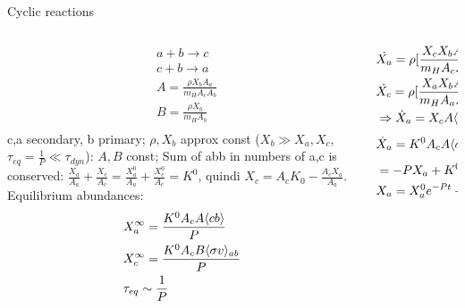 \begin{frame}{Cyclic reactions}
    \begin{columns}[T]
        \begin{column}{0.3\textwidth}
            \begin{align*}
                &a+b\to c\\
                &c+b\to a\\
                &A=\frac{\rho X_bA_a}{m_HA_cA_b}\\
                &B=\frac{\rho X_b}{m_HA_b}\\
                &
            \end{align*}
            c,a secondary, b primary; $\rho, X_b$ approx const ($X_b\gg X_a,X_c$, $\tau_{eq}=\frac{1}{P}\ll\tau_{dyn}$): $A,B$ const; Sum of abb in numbers of a,c is conserved: $\frac{X_a}{A_a}+\frac{X_c}{A_c}=\frac{X_a^0}{A_a}+\frac{X_c^0}{A_c}=K^0$, quindi $X_c=A_cK_0-\frac{A_cX_a}{A_a}$. Equilibrium abundances:
            \begin{align*}
                &X_a^{\infty}=\frac{K^0A_cA\langle cb \rangle}{P}\\
                &X_c^{\infty}=\frac{K^0A_cB\langle \sigma v \rangle_{ab}}{P}\\
                &\tau_{eq}\sim \frac{1}{P}
            \end{align*}

        \end{column}
        \begin{column}{0.7\textwidth}
            \begin{align*}
                &\dot{X_a}=\rho[\frac{X_cX_bA_a}{m_HA_cA_b}\langle \sigma v \rangle_{cb}-\frac{X_aX_b}{m_HA_b}\langle \sigma v \rangle_{ab}]\\
                &\dot{X_c}=\rho[\frac{X_aX_bA_c}{m_HA_aA_b}\langle \sigma v \rangle_{ab}-\frac{X_cX_b}{m_HA_b}\langle \sigma v \rangle_{cb}]\\
                &\Rightarrow\dot{X}_a=X_cA\langle \sigma v \rangle_{cb}-X_aB\langle \sigma v \rangle_{ab}\\
                &\dot{X}_a=K^0A_cA\langle \sigma v \rangle_{cb}-X_a(\frac{A_cA}{A_a}\langle \sigma v \rangle_{cb}+B\langle \sigma v \rangle_{ab})\\
                &=-PX_a+K^0A_cA\langle \sigma v \rangle_{cb}\\
                &X_a=X_a^0e^{-Pt}+X_a^{\infty}(1-e^{-Pt})
            \end{align*}
        \end{column}
    \end{columns}
\end{frame}

